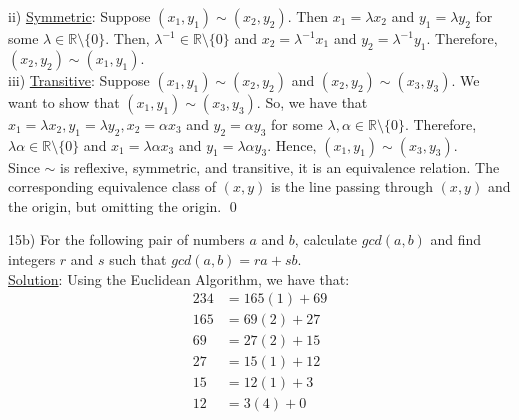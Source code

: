 \documentclass{article}
\begin{document}
ii) \underline{Symmetric}: Suppose $(x_1, y_1) \sim (x_2, y_2).$ Then $x_1 = \lambda x_2$ and $y_1 = \lambda y_2$ for some $\lambda \in \mathbb{R} \setminus \{0\}.$ Then, $\lambda^{-1} \in \mathbb{R} \setminus \{0\}$ and $x_2 = \lambda^{-1} x_1$ and $y_2 = \lambda^{-1} y_1.$ Therefore, $(x_2, y_2) \sim (x_1, y_1).$ \\

iii) \underline{Transitive}: Suppose $(x_1, y_1) \sim (x_2, y_2)$ and $(x_2, y_2) \sim (x_3, y_3).$ We want to show that $(x_1, y_1) \sim (x_3, y_3).$ So, we have that $x_1 = \lambda x_2, y_1 = \lambda y_2, x_2 = \alpha x_3$ and $y_2 = \alpha y_3$ for some $\lambda, \alpha \in \mathbb{R} \setminus \{ 0 \}.$ Therefore, $\lambda \alpha \in \mathbb{R} \setminus \{ 0 \}$ and $x_1 = \lambda \alpha x_3$ and $y_1 = \lambda \alpha y_3$. Hence, $(x_1, y_1) \sim (x_3, y_3).$ \\

Since $\sim$ is reflexive, symmetric, and transitive, it is an equivalence relation.  The corresponding equivalence class of $(x, y)$ is the line passing through $(x, y)$ and the origin, but omitting the origin. \qed \pagebreak

15b) For the following pair of numbers $a$ and $b$, calculate $gcd(a, b)$ and find integers $r$ and $s$ such that $gcd(a, b) = ra + sb. $ \\

\underline{Solution}: Using the Euclidean Algorithm, we have that:
\begin{align*}
	234 &= 165(1) + 69 \\
	165 &= 69(2) + 27 \\
	69 &= 27(2) + 15 \\
	27 &= 15(1) + 12 \\
	15 &= 12(1) + 3 \\
	12 &= 3(4) + 0
\end{align*}
\end{document}

